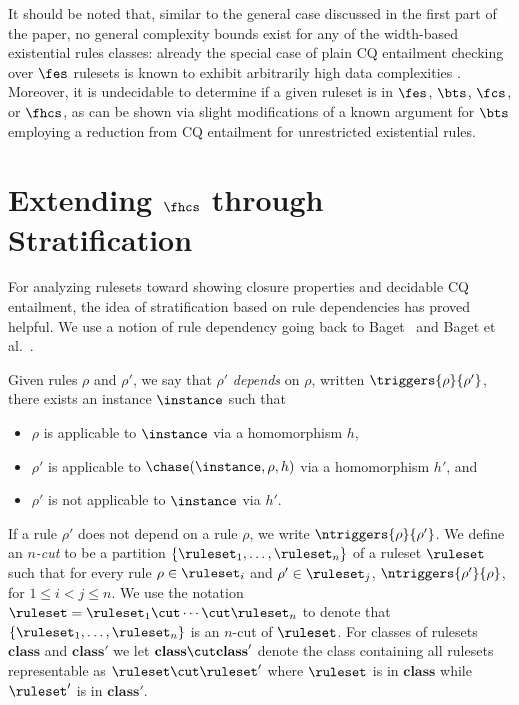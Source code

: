 It should be noted that, similar to the general case discussed in the first part of the paper, no general complexity bounds exist for any of the width-based existential rules classes: already the special case of plain CQ entailment checking over $\fes$ rulesets is known to exhibit arbitrarily high data complexities \cite{BourgauxCKRT21}. 
%
Moreover, it is undecidable to determine if a given ruleset is in $\fes$, $\bts$, $\fcs$, or $\fhcs$, as can be shown via slight modifications of a known argument for $\bts$  \cite{BagLecMugSal11} \remarkstart employing a reduction from CQ entailment for unrestricted existential rules\color{black}.  


\section{Extending $\fhcs$ through Stratification}\label{sec:strat}

For analyzing rulesets toward showing closure properties and decidable CQ entailment, the idea of stratification based on rule dependencies has proved helpful. 
We use a notion of rule dependency going back to Baget~\cite{Bag04} and Baget et al.~\cite{BagLecMugSal11}.   

\begin{definition} Given rules $\rho$ and $\rho'$, we say that $\rho'$ \emph{depends} on $\rho$, written $\triggers{\rho}{\rho'}$, \iffi there exists an instance $\instance$ such that 
\begin{itemize}
    \item $\rho$ is applicable to $\instance$ via a homomorphism $h$, 
    \item $\rho'$ is applicable to $\chase(\instance,\rho,h)$ via a homomorphism $h'$, and
    \item $\rho'$ is not applicable to $\instance$ via $h'$.
\end{itemize}
If a rule $\rho'$ does not depend on a rule $\rho$, we write $\ntriggers{\rho}{\rho'}$. We define an \emph{$n$-cut} to be a partition $\{\ruleset_{1}, \ldots, \ruleset_{n}\}$ of a ruleset $\ruleset$ such that for every rule $\rho \in \ruleset_{i}$ and $\rho' \in \ruleset_{j}$, $\ntriggers{\rho'}{\rho}$, for $1 \leq i < j \leq n$. We use the notation $\ruleset = \ruleset_{1} \cut \cdots \cut \ruleset_{n}$ to denote that $\{\ruleset_{1}, \ldots, \ruleset_{n}\}$ is an $n$-cut of $\ruleset$.
\remarkstart For classes of rulesets $\mathbf{class}$ and $\mathbf{class}'$  we let $\mathbf{class} \cut \mathbf{class}'$ denote the class containing all rulesets representable as $\ruleset \cut \ruleset'$ where $\ruleset$ is in $\mathbf{class}$ while  $\ruleset'$ is in $\mathbf{class}'$.\color{black}
\end{definition}

